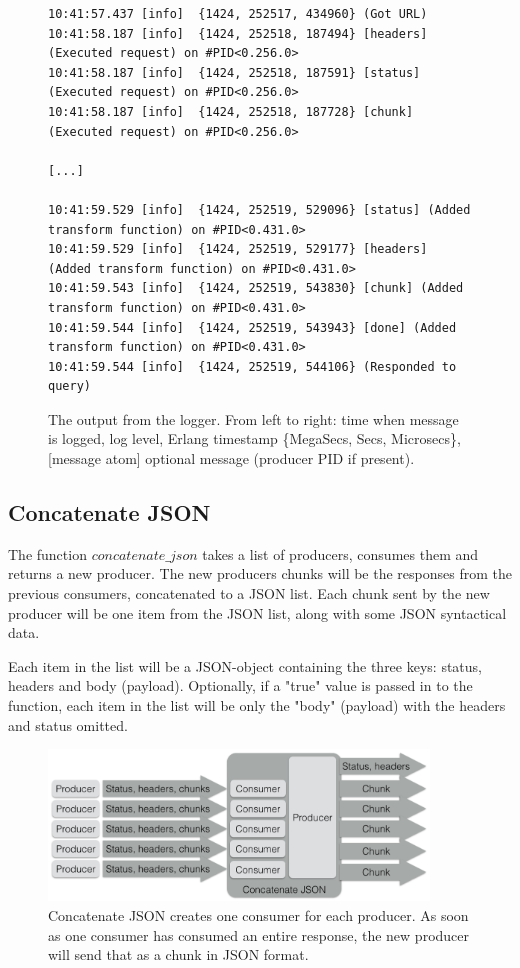 \documentclass{cslthse-msc}
\begin{document}
\begin{figure}[H]
  \centering
\begin{lstlisting}[breaklines=true,frame=single]
10:41:57.437 [info]  {1424, 252517, 434960} (Got URL)
10:41:58.187 [info]  {1424, 252518, 187494} [headers] (Executed request) on #PID<0.256.0>
10:41:58.187 [info]  {1424, 252518, 187591} [status] (Executed request) on #PID<0.256.0>
10:41:58.187 [info]  {1424, 252518, 187728} [chunk] (Executed request) on #PID<0.256.0>

[...]

10:41:59.529 [info]  {1424, 252519, 529096} [status] (Added transform function) on #PID<0.431.0>
10:41:59.529 [info]  {1424, 252519, 529177} [headers] (Added transform function) on #PID<0.431.0>
10:41:59.543 [info]  {1424, 252519, 543830} [chunk] (Added transform function) on #PID<0.431.0>
10:41:59.544 [info]  {1424, 252519, 543943} [done] (Added transform function) on #PID<0.431.0>
10:41:59.544 [info]  {1424, 252519, 544106} (Responded to query)
\end{lstlisting}
  \caption{The output from the logger. From left to right: time when message is logged, log level, Erlang timestamp \{MegaSecs, Secs, Microsecs\}, [message atom] optional message (producer PID if present).}
\end{figure}

\subsection{Concatenate JSON}
The function $concatenate\_json$ takes a list of producers, consumes them and returns a new producer. The new producers chunks will be the responses from the previous consumers, concatenated to a JSON list. Each chunk sent by the new producer will be one item from the JSON list, along with some JSON syntactical data.

Each item in the list will be a JSON-object containing the three keys: status, headers and body (payload). Optionally, if a "true" value is passed in to the function, each item in the list will be only the "body" (payload) with the headers and status omitted.


\begin{figure}[H]
  \centering
    \begin{center}
      \includegraphics[width=0.9\textwidth]{images/crocpear_concatenate_json.png}
    \end{center}
  \caption{Concatenate JSON creates one consumer for each producer. As soon as one consumer has consumed an entire response, the new producer will send that as a chunk in JSON format.}
\end{figure}
\end{document}
